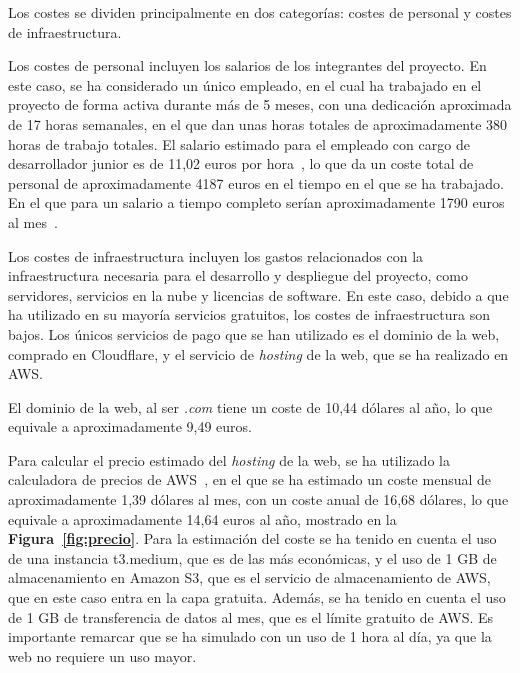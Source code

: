 Los costes se dividen principalmente en dos categorías: costes de personal y costes de infraestructura.

Los costes de personal incluyen los salarios de los integrantes del proyecto. En este caso, se ha considerado un único empleado, en el cual ha trabajado en el proyecto de forma activa durante más de 5 meses, con una dedicación aproximada de 17 horas semanales, en el que dan unas horas totales de aproximadamente 380 horas de trabajo totales. El salario estimado para el empleado con cargo de desarrollador junior es de 11,02 euros por hora~\cite{salario}, lo que da un coste total de personal de aproximadamente 4187 euros en el tiempo en el que se ha trabajado. En el que para un salario a tiempo completo serían aproximadamente 1790 euros al mes~\cite{salario}.


Los costes de infraestructura incluyen los gastos relacionados con la infraestructura necesaria para el desarrollo y despliegue del proyecto, como servidores, servicios en la nube y licencias de software. En este caso, debido a que ha utilizado en su mayoría servicios gratuitos, los costes de infraestructura son bajos.
Los únicos servicios de pago que se han utilizado es el dominio de la web, comprado en Cloudflare, y el servicio de \textit{hosting} de la web, que se ha realizado en AWS.

El dominio de la web, al ser \textit{.com} tiene un coste de 10,44 dólares al año, lo que equivale a aproximadamente 9,49 euros.

Para calcular el precio estimado del \textit{hosting} de la web, se ha utilizado la calculadora de precios de AWS~\cite{awsCalculator}, en el que se ha estimado un coste mensual de aproximadamente 1,39 dólares al mes, con un coste anual de 16,68 dólares, lo que equivale a aproximadamente 14,64 euros al año, mostrado en la \textbf{Figura~\ref{fig:precio}}. Para la estimación del coste se ha tenido en cuenta el uso de una instancia t3.medium, que es de las más económicas, y el uso de 1 GB de almacenamiento en Amazon S3, que es el servicio de almacenamiento de AWS, que en este caso entra en la capa gratuita. Además, se ha tenido en cuenta el uso de 1 GB de transferencia de datos al mes, que es el límite gratuito de AWS. Es importante remarcar que se ha simulado con un uso de 1 hora al día, ya que la web no requiere un uso mayor.



